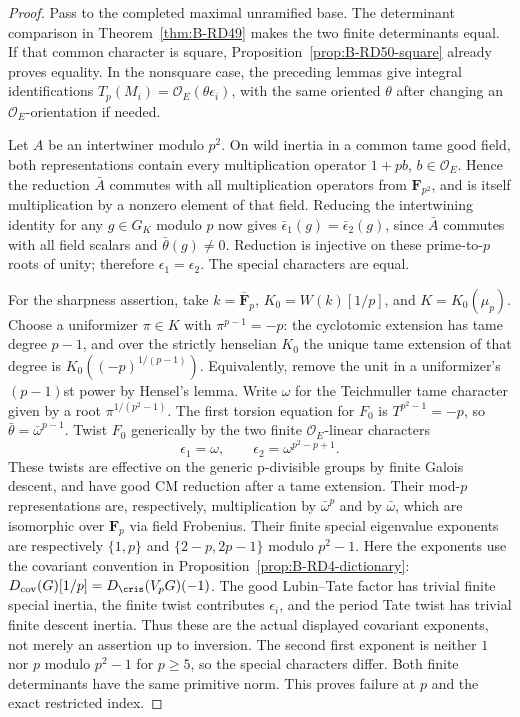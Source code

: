 \begin{proof}
Pass to the completed maximal unramified base. The determinant
comparison in Theorem~\ref{thm:B-RD49} makes the two finite
determinants equal. If that common character is square,
Proposition~\ref{prop:B-RD50-square} already proves equality.
In the nonsquare case, the preceding lemmas give integral
identifications $T_p(M_i)=\mathcal O_E(\theta\epsilon_i)$,
with the same oriented $\theta$ after changing an
$\mathcal O_E$-orientation if needed.

Let $A$ be an intertwiner modulo $p^2$. On wild inertia in
a common tame good field, both representations contain
every multiplication operator $1+pb$, $b\in\mathcal O_E$.
Hence the reduction $\bar A$ commutes with all multiplication
operators from $\mathbf F_{p^2}$, and is itself multiplication
by a nonzero element of that field. Reducing the intertwining
identity for any $g\in G_K$ modulo $p$ now gives
$\bar\epsilon_1(g)=\bar\epsilon_2(g)$, since $\bar A$
commutes with all field scalars and $\bar\theta(g)\ne0$.
Reduction is injective on these prime-to-$p$ roots of unity;
therefore $\epsilon_1=\epsilon_2$. The special characters
are equal.

For the sharpness assertion, take $k=\overline{\mathbf F}_p$,
$K_0=W(k)[1/p]$, and $K=K_0(\mu_p)$. Choose a uniformizer
$\pi\in K$ with $\pi^{p-1}=-p$: the cyclotomic extension
has tame degree $p-1$, and over the strictly henselian
$K_0$ the unique tame extension of that degree is
$K_0((-p)^{1/(p-1)})$. Equivalently, remove the unit in a
uniformizer's $(p-1)$st power by Hensel's lemma.
Write $\omega$ for
the Teichmuller tame character given by a root
$\pi^{1/(p^2-1)}$. The first torsion equation for $F_0$ is
$T^{p^2-1}=-p$, so
$\bar\theta=\bar\omega^{p-1}$.
Twist $F_0$ generically by the two finite
$\mathcal O_E$-linear characters
\[
            \epsilon_1=\omega,\qquad
            \epsilon_2=\omega^{p^2-p+1}.               \tag{B-RD52.3}
\]
These twists are effective on the generic p-divisible groups
by finite Galois descent, and have good CM reduction after
a tame extension. Their mod-$p$ representations are,
respectively, multiplication by $\bar\omega^p$ and by
$\bar\omega$, which are isomorphic over $\mathbf F_p$
via field Frobenius.
Their finite special eigenvalue exponents are respectively
$\{1,p\}$ and $\{2-p,2p-1\}$ modulo $p^2-1$.
Here the exponents use the covariant convention in
Proposition~\ref{prop:B-RD4-dictionary}:
$D_{\mathrm{cov}}(G)[1/p]=D_{\cris}(V_pG)(-1)$.
The good Lubin--Tate factor has trivial finite special inertia,
the finite twist contributes $\epsilon_i$, and the period
Tate twist has trivial finite descent inertia. Thus these
are the actual displayed covariant exponents, not merely
an assertion up to inversion.
The second first exponent is neither $1$ nor $p$ modulo
$p^2-1$ for $p\ge5$, so the special characters differ.
Both finite determinants have the same primitive norm.
This proves failure at $p$ and the exact restricted index.
\end{proof}

